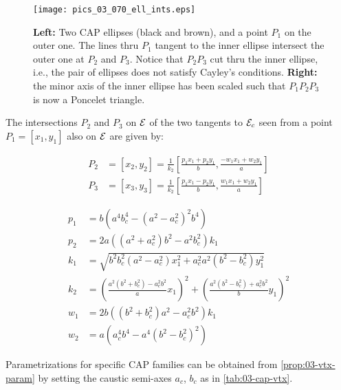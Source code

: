 \begin{figure}
    \centering
    \texttt{[image: pics\_03\_070\_ell\_ints.eps]}
    \caption{\textbf{Left:} Two CAP ellipses (black and brown), and a point $P_1$ on the outer one. The lines thru $P_1$ tangent to the inner ellipse intersect the outer one at $P_2$ and $P_3$. Notice that $P_2 P_3$ cut thru the inner ellipse, i.e., the pair of ellipses does not satisfy Cayley's conditions. \textbf{Right:} the minor axis of the inner ellipse has been scaled such that $P_1 P_2 P_3$ is now a Poncelet triangle.}
    \label{fig:ell-ints}
\end{figure}

\begin{proposition}
The intersections $P_2$ and $P_3$ on $\mathcal{E}$ of the two tangents to $\mathcal{E}_c$ seen from a point $P_1=[x_1,y_1]$ also on $\mathcal{E}$ are given by:

\begin{align*}
    P_2& =[x_2,y_2]=\frac{1}{k_2}\left[\frac{p_1 x_1 + p_2 y_1}{b} ,  \frac{-w_1 x_1 + w_2 y_1}{a} \right] \\
    P_3&=[x_3,y_3]=\frac{1}{k_2}\left[\frac{p_1 x_1 - p_2 y_1}{b},\frac{w_1 x_1 + w_2 y_1}{a}\right]
\end{align*}

\begin{align*}
    p_1 &=b\left(a^4  b_c^4 -(a^2 -  a_c^2)^2 b^4 \right) \\
    p_2 &= 2 a  \left( (a^2 + a_c^2)b^2 - a^2b_c^2  \right) k_1 \\
    k_1&=\sqrt{ b^2  b_c^2 (a^2 -  a_c^2)  x_1^2 +  a_c^2 a^2(b^2 -  b_c^2)  y_1^2}\\
    k_2 &=\left(\frac{a^2 (b^2 +  b_c^2) - a_c^2 b^2 }{a}x_1\right)^2+ \left(\frac{a^2 (b^2 -  b_c^2) + a_c^2b^2 }{b} y_1\right)^2\\
    w_1&=2 b \left( (b^2 +  b_c^2) a^2 - a_c^2 b^2\right) k_1 \\
    w_2&= a\left(a_c^4b^4-a^4(b^2-b_c^2)^2\right)
\end{align*}
\label{prop:03-vtx-param}
\end{proposition}

Parametrizations for specific CAP families can be obtained from \cref{prop:03-vtx-param} by setting the caustic semi-axes $a_c$, $b_c$ as in \cref{tab:03-cap-vtx}.


